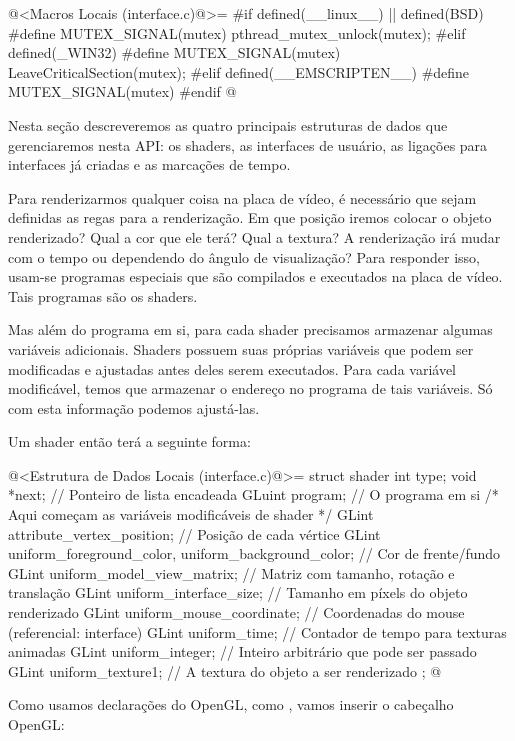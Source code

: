 \iniciocodigo
@<Macros Locais (interface.c)@>=
#if defined(__linux__) || defined(BSD)
#define MUTEX_SIGNAL(mutex) pthread_mutex_unlock(mutex);
#elif defined(_WIN32)
#define MUTEX_SIGNAL(mutex) LeaveCriticalSection(mutex);
#elif defined(__EMSCRIPTEN__)
#define MUTEX_SIGNAL(mutex)
#endif
@
\fimcodigo


Nesta seção descreveremos as quatro principais estruturas de dados que
gerenciaremos nesta API: os shaders, as interfaces de usuário, as
ligações para interfaces já criadas e as marcações de tempo.


Para renderizarmos qualquer coisa na placa de vídeo, é necessário que
sejam definidas as regas para a renderização. Em que posição iremos
colocar o objeto renderizado? Qual a cor que ele terá? Qual a textura?
A renderização irá mudar com o tempo ou dependendo do ângulo de
visualização? Para responder isso, usam-se programas especiais que são
compilados e executados na placa de vídeo. Tais programas são os
shaders.

Mas além do programa em si, para cada shader precisamos armazenar
algumas variáveis adicionais. Shaders possuem suas próprias variáveis
que podem ser modificadas e ajustadas antes deles serem
executados. Para cada variável modificável, temos que armazenar o
endereço no programa de tais variáveis. Só com esta informação podemos
ajustá-las.

Um shader então terá a seguinte forma:

\iniciocodigo
@<Estrutura de Dados Locais (interface.c)@>=
struct shader {
  int type;
  void *next; // Ponteiro de lista encadeada
  GLuint program; // O programa em si
  /* Aqui começam as variáveis modificáveis de shader */
  GLint attribute_vertex_position; // Posição de cada vértice
  GLint uniform_foreground_color, uniform_background_color; // Cor de frente/fundo
  GLint uniform_model_view_matrix; // Matriz com tamanho, rotação e translação
  GLint uniform_interface_size; // Tamanho em píxels do objeto renderizado
  GLint uniform_mouse_coordinate; // Coordenadas do mouse (referencial: interface)
  GLint uniform_time; // Contador de tempo para texturas animadas
  GLint uniform_integer; // Inteiro arbitrário que pode ser passado
  GLint uniform_texture1; // A textura do objeto a ser renderizado
};
@
\fimcodigo

Como usamos declarações do OpenGL, como , vamos
inserir o cabeçalho OpenGL:

